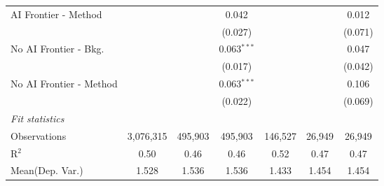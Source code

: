 \begin{tabular}{lcccccc}
   AI Frontier - Method    &               &               & 0.042         &               &               & 0.012\\   
                           &               &               & (0.027)       &               &               & (0.071)\\   
   No AI Frontier - Bkg.   &               &               & 0.063$^{***}$ &               &               & 0.047\\   
                           &               &               & (0.017)       &               &               & (0.042)\\   
   No AI Frontier - Method &               &               & 0.063$^{***}$ &               &               & 0.106\\   
                           &               &               & (0.022)       &               &               & (0.069)\\   
   \midrule
   \emph{Fit statistics}\\
   Observations            & 3,076,315     & 495,903       & 495,903       & 146,527       & 26,949        & 26,949\\  
   R$^2$                   & 0.50          & 0.46          & 0.46          & 0.52          & 0.47          & 0.47\\  
Mean(Dep. Var.) & 1.528 & 1.536 & 1.536 & 1.433 & 1.454 & 1.454 \\
   

\end{tabular}
